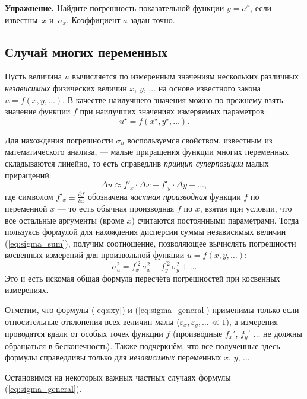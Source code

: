 \documentclass[10pt]{article}
\begin{document}
\textbf{\footnotesize{}Упражнение. }{\footnotesize{}Найдите погрешность
показательной функции $y=a^{x}$, если известны~$x$ и~$\sigma_{x}$.
Коэффициент $a$ задан точно.}{\footnotesize\par}

\subsection{Случай многих переменных}

Пусть величина $u$ вычисляется по измеренным значениям нескольких
различных \emph{независимых} физических величин $x$, $y$, $\ldots$
на основе известного закона $u=f\!\left(x,y,\ldots\right)$. В качестве
наилучшего значения можно по-прежнему взять значение функции $f$
при наилучших значениях измеряемых параметров:
\[
u^{\star}=f\!\left(x^{\star},y^{\star},\ldots\right).
\]

Для нахождения погрешности $\sigma_{u}$ воспользуемся свойством,
известным из математического анализа, --- малые приращения
функции многих переменных складываются линейно, то есть справедлив
\emph{принцип суперпозиции} малых приращений:
\[
\Delta u\approx f'_{x}\cdot\Delta x+f'_{y}\cdot\Delta y+\ldots,
\]
где символом $f'_{x}\equiv\frac{\partial f}{\partial x}$ обозначена
\emph{частная производная} функции $f$ по переменной $x$ ---
то есть обычная производная $f$ по $x$, взятая при условии, что
все остальные аргументы (кроме $x$) считаются постоянными параметрами.
Тогда пользуясь формулой для нахождения дисперсии суммы независимых
величин (\ref{eq:sigma_sum}), получим соотношение, позволяющее вычислять
погрешности косвенных измерений для произвольной функции $u=f\left(x,y,\ldots\right)$:
\begin{equation}
\boxed{\sigma_{u}^{2}=f_{x}^{\prime2}\,\sigma_{x}^{2}+f_{y}^{\prime2}\,\sigma_{y}^{2}+\ldots}\label{eq:sigma_general}
\end{equation}
Это и есть искомая общая формула пересчёта погрешностей при косвенных
измерениях.

Отметим, что формулы (\ref{eq:sxy}) и (\ref{eq:sigma_general}) применимы
только если относительные отклонения всех величин малы ($\varepsilon_{x},\varepsilon_{y},\ldots\ll1$),
а измерения проводятся вдали от особых точек функции $f$ (производные
$f_{x}'$, $f_{y}'$ $\ldots$ не должны обращаться в бесконечность).
Также подчеркнём, что все полученные здесь формулы справедливы только
для \emph{независимых} переменных $x$, $y$, $\ldots$

Остановимся на некоторых важных частных случаях формулы (\ref{eq:sigma_general}).
\end{document}
